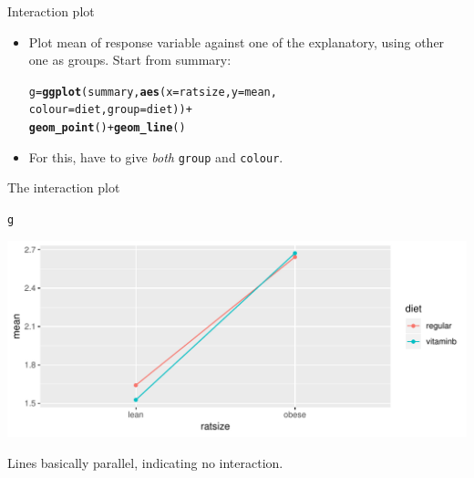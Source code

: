 \documentclass[unknownkeysallowed]{beamer}\usepackage[]{graphicx}\usepackage[]{color}
\makeatletter
\def\maxwidth{ %
  \ifdim\Gin@nat@width>\linewidth
    \linewidth
  \else
    \Gin@nat@width
  \fi
}
\newcommand{\hlopt}[1]{\textcolor[rgb]{0,0,0}{#1}}%
\newcommand{\hlstd}[1]{\textcolor[rgb]{0.345,0.345,0.345}{#1}}%
\newcommand{\hlkwb}[1]{\textcolor[rgb]{0.69,0.353,0.396}{#1}}%
\newcommand{\hlkwc}[1]{\textcolor[rgb]{0.333,0.667,0.333}{#1}}%
\newcommand{\hlkwd}[1]{\textcolor[rgb]{0.737,0.353,0.396}{\textbf{#1}}}%
\newenvironment{kframe}{%
 \def\at@end@of@kframe{}%
 \ifinner\ifhmode%
  \def\at@end@of@kframe{\end{minipage}}%
  \begin{minipage}{\columnwidth}%
 \fi\fi%
 \def\FrameCommand##1{\hskip\@totalleftmargin \hskip-\fboxsep
 \colorbox{shadecolor}{##1}\hskip-\fboxsep
     \hskip-\linewidth \hskip-\@totalleftmargin \hskip\columnwidth}%
 \MakeFramed {\advance\hsize-\width
   \@totalleftmargin\z@ \linewidth\hsize
   \@setminipage}}%
 {\par\unskip\endMakeFramed%
 \at@end@of@kframe}
\newenvironment{knitrout}{}{} %
\makeatother
\begin{document}
\begin{frame}[fragile]{Interaction plot}
  
  \begin{itemize}
  \item Plot mean of response variable against one of the explanatory, using
    other one as groups. Start from summary:
    
\begin{knitrout}
\color{fgcolor}\begin{kframe}
\begin{alltt}
\hlstd{g}\hlkwb{=}\hlkwd{ggplot}\hlstd{(summary,}\hlkwd{aes}\hlstd{(}\hlkwc{x}\hlstd{=ratsize,}\hlkwc{y}\hlstd{=mean,}
     \hlkwc{colour}\hlstd{=diet,}\hlkwc{group}\hlstd{=diet))}\hlopt{+}
  \hlkwd{geom_point}\hlstd{()}\hlopt{+}\hlkwd{geom_line}\hlstd{()}
\end{alltt}
\end{kframe}
\end{knitrout}

\item For this, have to give \emph{both} \texttt{group} and \texttt{colour}.
  \end{itemize}
  
\end{frame}

\begin{frame}[fragile]{The interaction plot}
\begin{knitrout}
\color{fgcolor}\begin{kframe}
\begin{alltt}
\hlstd{g}
\end{alltt}
\end{kframe}
\includegraphics[width=\maxwidth]{figure/unnamed-chunk-167-1} 

\end{knitrout}

Lines basically parallel, indicating no interaction.
\end{frame}
\end{document}
